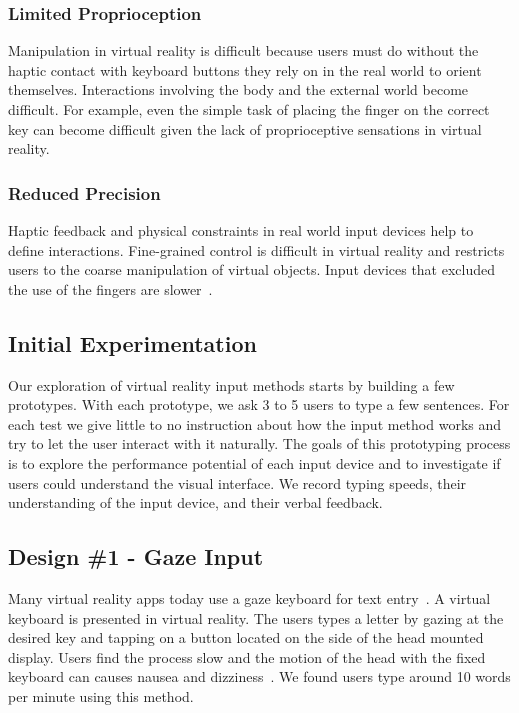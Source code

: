 \subsubsection{Limited Proprioception}
Manipulation in virtual reality is difficult because users must do without the haptic contact with keyboard buttons they rely on in the real world to orient themselves.
Interactions involving the body and the external world become difficult.
For example, even the simple task of placing the finger on the correct key can become difficult given the lack of proprioceptive sensations in virtual reality.

\subsubsection{Reduced Precision}
Haptic feedback and physical constraints in real world input devices help to define interactions. 
Fine-grained control is difficult in virtual reality and restricts users to the coarse manipulation of virtual objects.
Input devices that excluded the use of the fingers are slower~\cite{Zhai:1996:IMG:238386.238534}.  

\subsection{Initial Experimentation}

Our exploration of virtual reality input methods starts by building a few prototypes.
With each prototype, we ask 3 to 5 users to type a few sentences.  
For each test we give little to no instruction about how the input method works and try to let the user interact with it naturally.
The goals of this prototyping process is to explore the performance potential of each input device and to investigate if users could understand the visual interface.
We record typing speeds, their understanding of the input device, and their verbal feedback.

\subsection{Design \#1 - Gaze Input}
Many virtual reality apps today use a gaze keyboard for text entry~\cite{netflix_app_for_oculus}.
A virtual keyboard is presented in virtual reality.
The users types a letter by gazing at the desired key and tapping on a button located on the side of the head mounted display.
Users find the process slow and the motion of the head with the fixed keyboard can causes nausea and dizziness~\cite{atienza2016interaction}.
We found users type around 10 words per minute using this method.

